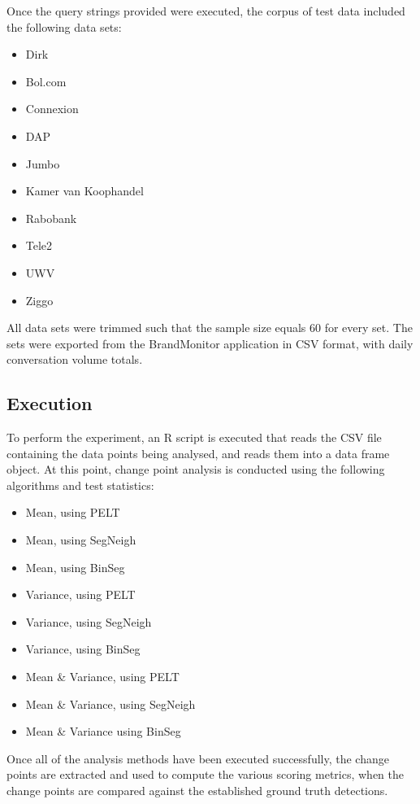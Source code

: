 \documentclass{uvamscse}	%
\begin{document}
Once the query strings provided were executed, the corpus of test data included the following data sets:

\begin{itemize}
    \item Dirk
    \item Bol.com
    \item Connexion
    \item DAP
    \item Jumbo
    \item Kamer van Koophandel
    \item Rabobank
    \item Tele2
    \item UWV
    \item Ziggo
\end{itemize}

All data sets were trimmed such that the sample size equals 60 for every set. The sets were exported from the BrandMonitor application in CSV format, with daily conversation volume totals.

\subsection{Execution}

To perform the experiment, an \textsf{R} script is executed that reads the CSV file containing the data points being analysed, and reads them into a data frame object. At this point, change point analysis is conducted using the following algorithms and test statistics:

\begin{itemize}
    \item Mean, using PELT
    \item Mean, using SegNeigh
    \item Mean, using BinSeg
    \item Variance, using PELT
    \item Variance, using SegNeigh
    \item Variance, using BinSeg
    \item Mean \& Variance, using PELT
    \item Mean \& Variance, using SegNeigh
    \item Mean \& Variance using BinSeg
\end{itemize}

Once all of the analysis methods have been executed successfully, the change points are extracted and used to compute the various scoring metrics, when the change points are compared against the established ground truth detections.
\end{document}
